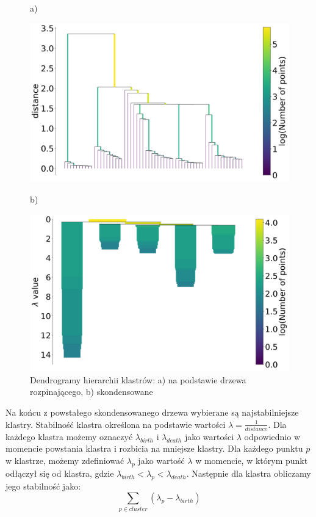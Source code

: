 	\begin{figure}[htb]
		\centering
		\begin{minipage}{.5\textwidth}
			a)\par\medskip %
			\begin{flushleft}
				\includegraphics[width=.95\linewidth]{rys04/hdbscan_slt.png}
			\end{flushleft}
		\end{minipage}%
		\begin{minipage}{.5\textwidth}
			b)\par\medskip %
			\begin{flushright}
				\includegraphics[width=.95\linewidth]{rys04/hdbscan_ct.png}
			\end{flushright}
		\end{minipage}
		\caption{Dendrogramy hierarchii klastrów: a) na podstawie drzewa rozpinającego, b) skondensowane}\label{fig:dendrogram} %
	\end{figure}

	Na końcu z powstałego skondensowanego drzewa wybierane są najstabilniejsze klastry.
	Stabilność klastra określona na podstawie wartości \(\lambda=\frac{1}{distance}\).
	Dla każdego klastra możemy oznaczyć \(\lambda_{birth}\) i \(\lambda_{death}\) jako wartości \(\lambda\)
		odpowiednio w momencie powstania klastra i rozbicia na mniejsze klastry.
	Dla każdego punktu \(p\) w klastrze, możemy zdefiniować \(\lambda_p\)
		jako wartość \(\lambda\) w momencie, w którym punkt odłączył się od klastra, gdzie \(\lambda_{birth} < \lambda_p < \lambda_{death}\).
	Następnie dla klastra obliczamy jego stabilność jako:
	\[ \sum_{p\in cluster}\left(\lambda_p - \lambda_{birth}\right) \]

